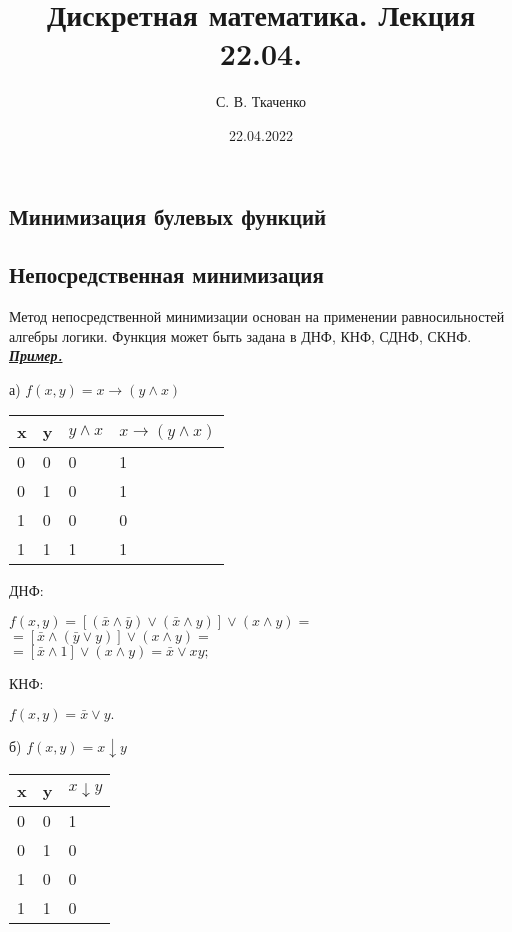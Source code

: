 \documentclass{article}
\title{Дискретная математика. Лекция 22.04.}
\author{С. В. Ткаченко}
\date{22.04.2022}
\begin{document}
	\maketitle
	\begin{center}
	\section*{Минимизация булевых функций}
	\subsection*{Непосредственная минимизация}
	\end{center}
	Метод непосредственной минимизации основан на применении равносильностей алгебры логики.
	Функция может быть задана в ДНФ, КНФ, СДНФ, СКНФ.\\
	\textit{\textbf{\underline{Пример.}}}
	
	\begin{table}[ht]
		\centering
		а) $f(x, y) = x \rightarrow (y \wedge x)$\\
		\vspace{5pt}
		\begin{tabular}{|l|l|l|l|}
			\hline
			x & y & $y \wedge x$ & $x \rightarrow (y \wedge x)$ \\ \hline
			0 & 0 & 0            & 1                            \\ \hline
			0 & 1 & 0            & 1                            \\ \hline
			1 & 0 & 0            & 0                            \\ \hline
			1 & 1 & 1            & 1                            \\ \hline
		\end{tabular}
	\end{table}

	ДНФ:
	\begin{center}
	$f(x, y) = [(\bar{x} \wedge \bar{y}) \vee (\bar{x} \wedge y)] \vee (x \wedge y) =$\\
	$= [\bar{x} \wedge (\bar{y} \vee y)] \vee (x \wedge y) =$\\
	$= [\bar{x} \wedge 1] \vee (x \wedge y) = \bar{x} \vee xy;$
	\end{center}
	
	КНФ:
	\begin{center}
	$f(x, y) = \bar{x} \vee y.$
	\end{center}
	
	\begin{table}[ht]
		\centering
		б) $f(x, y) = x \downarrow y$\\
		\vspace{5pt}
		\begin{tabular}{|l|l|l|}
			\hline
			x & y & $x \downarrow y$ \\ \hline
			0 & 0 & 1                \\ \hline
			0 & 1 & 0                \\ \hline
			1 & 0 & 0                \\ \hline
			1 & 1 & 0                \\ \hline
		\end{tabular}
	\end{table}
	
\end{document}
